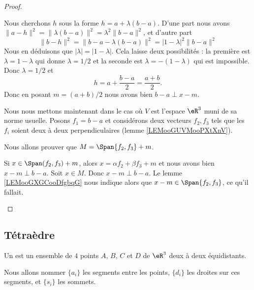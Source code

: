\begin{proof}
\begin{subproof}
		Nous cherchons \( h\) sous la forme \( h=a+\lambda(b-a)\). D'une part nous avons \( \| a-h \|^2=\| \lambda(b-a) \|^2=\lambda^2\| b-a \|^2\), et d'autre part
		\begin{equation}
			\| b-h \|^2=\| b-a-\lambda(b-a) \|^2=| 1-\lambda |^2\| b-a \|^2
		\end{equation}
		Nous en déduisons que \( | \lambda |=| 1-\lambda |\). Cela laisse deux possibilités : la première est \( \lambda=1-\lambda\) qui donne \( \lambda=1/2\) et la seconde est \( \lambda=-(1-\lambda)\) qui est impossible. Donc \( \lambda=1/2\) et
		\begin{equation}
			h=a+\frac{ b-a }{ 2 }=\frac{ a+b }{ 2 }.
		\end{equation}
		Donc en posant \( m=(a+b)/2\) nous avons bien \( b-a\perp x-m\).

		Nous nous mettons maintenant dans le cas où \( V\) est l'espace \( \eR^3\) muni de sa norme usuelle. Posons \( f_1=b-a\) et considérons deux vecteurs \( f_2,f_3\) tels que les \( f_i\) soient deux à deux perpendiculaires (lemme \ref{LEMooGUVMooPXtXnV}).

		Nous allons prouver que \( M=\Span\{ f_2,f_3 \}+m\).

		\begin{subproof}
			Si \( x\in \Span(f_2,f_3)+m\), alors \( x=\alpha f_2+\beta f_3+m\) et nous avons bien \( x-m\perp b-a\).
			Soit \( x\in M\). Donc \( x-m\perp b-a\). Le lemme \ref{LEMooGXGCooDfgbqG} nous indique alors que \( x-m\in\Span\{ f_2,f_3 \}\), ce qu'il fallait.
		\end{subproof}
	\end{subproof}
\end{proof}


\subsection{Tétraèdre}

\begin{definition}   \label{DEFooMUUMooFVxKyb}
	Un  est un ensemble de \( 4\) points \( A\), \( B\), \( C\) et \( D\) de \( \eR^3\) deux à deux équidistants.

	Nous allons nommer \( \{ a_i \}\) les segments entre les points, \( \{ d_i \}\) les droites sur ces segments, et \( \{ s_i \}\) les sommets.
\end{definition}

